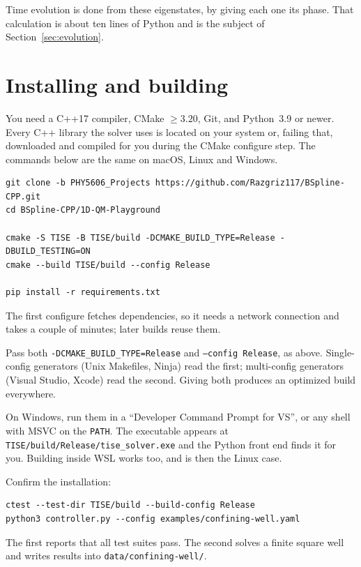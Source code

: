 \documentclass[11pt]{article}
\newcommand{\file}[1]{\texttt{#1}}
\begin{document}
Time evolution is done from these eigenstates, by giving each one its phase.
That calculation is about ten lines of Python and is the subject of
Section~\ref{sec:evolution}.

\section{Installing and building}
\label{sec:build}

You need a C++17 compiler, CMake $\geq 3.20$, Git, and Python~3.9 or newer.
Every C++ library the solver uses is located on your system or, failing that,
downloaded and compiled for you during the CMake configure step. The commands
below are the same on macOS, Linux and Windows.

\begin{lstlisting}[style=sh]
git clone -b PHY5606_Projects https://github.com/Razgriz117/BSpline-CPP.git
cd BSpline-CPP/1D-QM-Playground

cmake -S TISE -B TISE/build -DCMAKE_BUILD_TYPE=Release -DBUILD_TESTING=ON
cmake --build TISE/build --config Release

pip install -r requirements.txt
\end{lstlisting}

The first configure fetches dependencies, so it needs a network connection and
takes a couple of minutes; later builds reuse them.

Pass both \texttt{-DCMAKE\_BUILD\_TYPE=Release} and \texttt{--config Release},
as above. Single-config generators (Unix Makefiles, Ninja) read the first;
multi-config generators (Visual Studio, Xcode) read the second. Giving both
produces an optimized build everywhere.

On Windows, run them in a ``Developer Command Prompt for VS'', or any shell
with MSVC on the \texttt{PATH}. The executable appears at
\file{TISE/build/Release/tise\_solver.exe} and the Python front end finds it
for you. Building inside WSL works too, and is then the Linux case.

Confirm the installation:
\begin{lstlisting}[style=sh]
ctest --test-dir TISE/build --build-config Release
python3 controller.py --config examples/confining-well.yaml
\end{lstlisting}
The first reports that all test suites pass. The second solves a finite square
well and writes results into \file{data/confining-well/}.
\end{document}
